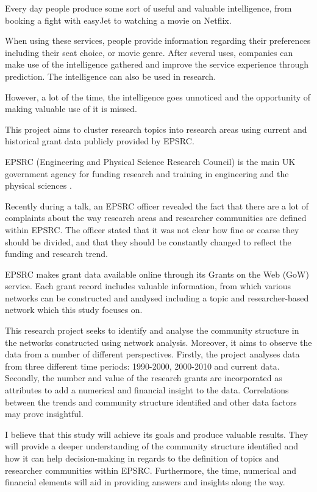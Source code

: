 Every day people produce some sort of useful and valuable intelligence, from booking a fight with easyJet to watching a movie on Netflix.

When using these services, people provide information regarding their preferences including their seat choice, or movie genre. After several uses, companies can make use of the intelligence gathered and improve the service experience through prediction. The intelligence can also be used in research.

However, a lot of the time, the intelligence goes unnoticed and the opportunity of making valuable use of it is missed.

This project aims to cluster research topics into research areas using current and historical grant data publicly provided by EPSRC.

EPSRC (Engineering and Physical Science Research Council) is the main UK government agency for funding research and training in engineering and the physical sciences \cite{epsrc_about_us}.

Recently during a talk, an EPSRC officer revealed the fact that there are a lot of complaints about the way research areas and researcher communities are defined within EPSRC. The officer stated that it was not clear how fine or coarse they should be divided, and that they should be constantly changed to reflect the funding and research trend.

EPSRC makes grant data available online through its Grants on the Web (GoW) service. Each grant record includes valuable information, from which various networks can be constructed and analysed including a topic and researcher-based network which this study focuses on.

This research project seeks to identify and analyse the community structure in the networks constructed using network analysis. Moreover, it aims to observe the data from a number of different perspectives. Firstly, the project analyses data from three different time periods: 1990-2000, 2000-2010 and current data. Secondly, the number and value of the research grants are incorporated as attributes to add a numerical and financial insight to the data. Correlations between the trends and community structure identified and other data factors may prove insightful.

I believe that this study will achieve its goals and produce valuable results. They will provide a deeper understanding of the community structure identified and how it can help decision-making in regards to the definition of topics and researcher communities within EPSRC. Furthermore, the time, numerical and financial elements will aid in providing answers and insights along the way.
\fi

